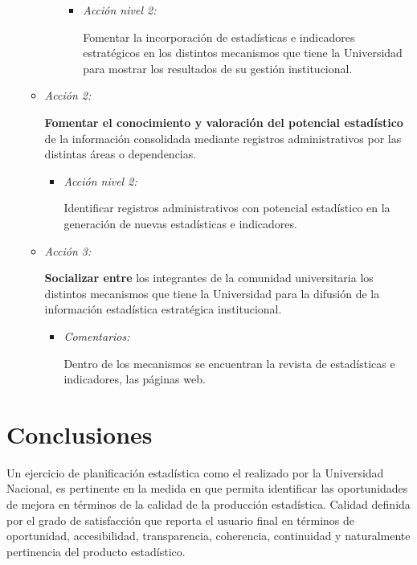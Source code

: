 \documentclass[
]{book}
\begin{document}
\begin{itemize}
\begin{itemize}
\begin{itemize}
      \begin{itemize}
      \item
        \emph{Acción nivel 2:}

        Fomentar la incorporación de estadísticas e indicadores estratégicos en los distintos mecanismos que tiene la Universidad para mostrar los resultados de su gestión institucional.
      \end{itemize}
    \end{itemize}
  \item
    \emph{Acción 2:}

    \textbf{Fomentar el conocimiento y valoración del potencial estadístico} de la información consolidada mediante registros administrativos por las distintas áreas o dependencias.

    \begin{itemize}
    \item
      \emph{Acción nivel 2:}

      Identificar registros administrativos con potencial estadístico en la generación de nuevas estadísticas e indicadores.
    \end{itemize}
  \item
    \emph{Acción 3:}

    \textbf{Socializar entre} los integrantes de la comunidad universitaria los distintos mecanismos que tiene la Universidad para la difusión de la información estadística estratégica institucional.

    \begin{itemize}
    \item
      \emph{Comentarios:}

      Dentro de los mecanismos se encuentran la revista de estadísticas e indicadores, las páginas web.
    \end{itemize}
  \end{itemize}
\end{itemize}

\hypertarget{conclusiones}{%
\chapter{Conclusiones}\label{conclusiones}}

Un ejercicio de planificación estadística como el realizado por la Universidad Nacional, es pertinente en la medida en que permita identificar las oportunidades de mejora en términos de la calidad de la producción estadística. Calidad definida por el grado de satisfacción que reporta el usuario final en términos de oportunidad, accesibilidad, transparencia, coherencia, continuidad y naturalmente pertinencia del producto estadístico.
\end{document}
